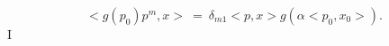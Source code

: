 \begin{equation}
< g(p_0) p^m , x > \ = \ \delta_{m 1} < p , x > g(\alpha <p_0 ,
x_0>).\label{423}\end{equation}I
